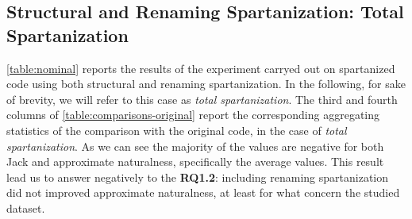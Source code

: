 \subsection{Structural and Renaming Spartanization: Total Spartanization}

\cref{table:nominal} reports the results of the experiment carryed out on
spartanized code using both structural and renaming spartanization.
In the following, for sake of brevity, we will refer to this case as \emph{total spartanization}.
The third and fourth columns of \cref{table:comparisons-original} report the corresponding 
aggregating statistics of the comparison with the original code, in the case of 
\emph{total spartanization}. 
As we can see the majority of the values are negative for both Jack and approximate naturalness, 
specifically the average values.  
This result lead us to answer negatively to the \textbf{RQ1.2}: including renaming spartanization 
did not improved approximate naturalness, at least for what concern the studied dataset.

